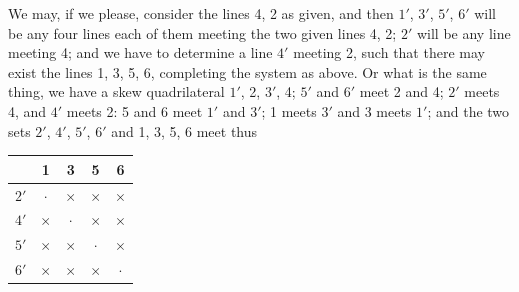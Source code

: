 \documentclass[11pt,a4paper]{article}
\begin{document}
We may, if we please, consider the lines 4, 2 as given, and then $1'$, $3'$, $5'$, $6'$ will be any four lines each of them meeting the two given lines 4, 2; $2'$ will be any line meeting 4; and we have to determine a line $4'$ meeting 2, such that there may exist the lines 1, 3, 5, 6, completing the system as above. Or what is the same thing, we have a skew quadrilateral $1'$, 2, $3'$, 4; $5'$ and $6'$ meet 2 and 4; $2'$ meets 4, and $4'$ meets 2: 5 and 6 meet $1'$ and $3'$; 1 meets $3'$ and 3 meets $1'$; and the two sets $2'$, $4'$, $5'$, $6'$ and 1, 3, 5, 6 meet thus
\begin{center}
\begin{tabular}{c|cccc}
& 1 & 3 & 5 & 6\\\hline
$2'$ & $\cdot$ & $\times$ & $\times$ & $\times$\\
$4'$ & $\times$ & $\cdot$ & $\times$ & $\times$\\
$5'$ & $\times$ & $\times$ & $\cdot$ & $\times$\\
$6'$ & $\times$ & $\times$ & $\times$ & $\cdot$
\end{tabular}
\end{center}
\end{document}
